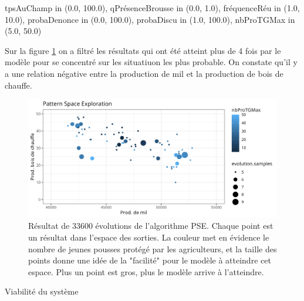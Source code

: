 \documentclass{article}
\begin{document}
    tpsAuChamp in (0.0, 100.0),
    qPrésenceBrousse in (0.0, 1.0),
    fréquenceRéu in (1.0, 10.0),
    probaDenonce in (0.0, 100.0),
    probaDiscu in (1.0, 100.0),
    nbProTGMax in (5.0, 50.0)

    Sur la figure \ref{fig:PSE} on a filtré les résultats qui ont été atteint plus de 4 fois par le modèle pour se concentré sur les situatiuon les plus probable. On constate qu'il y a une relation négative entre la production de mil et la production de bois de chauffe. 

        \begin{figure}[h]
            \centering
            \includegraphics[width=\textwidth]{./img/om_pse.png}
            \caption{Résultat de 33600 évolutions de l'algorithme PSE. Chaque point est un résultat dans l'espace des sorties. La couleur met en évidence le nombre de jeunes pousses protégé par les agriculteurs, et la taille des points donne une idée de la "facilité" pour le modèle à atteindre cet espace. Plus un point est gros, plus le modèle arrive à l'atteindre.}
            \label{fig:PSE}
        \end{figure}

Viabilité du système 

\end{document}
